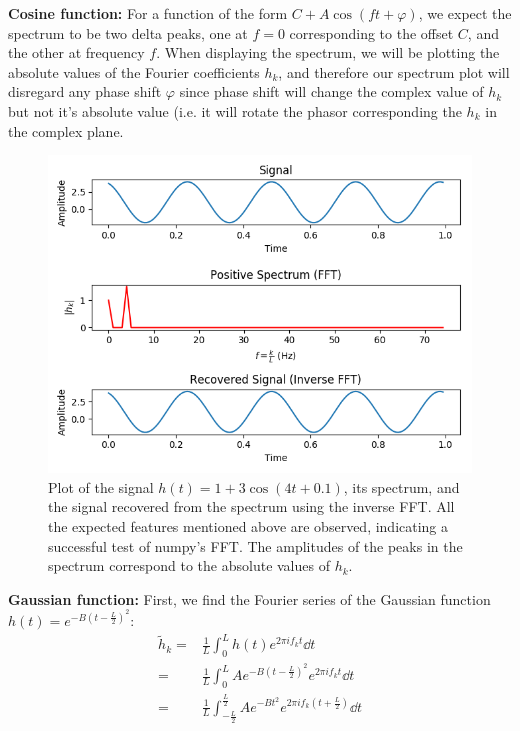 \documentclass[11pt]{article}
\begin{document}
\begin{enumerate}
	\textbf{Cosine function:} For a function of the form $C + A \cos (ft+\varphi)$, we expect the spectrum to be two delta peaks, one at $f=0$ corresponding to the offset $C$, and the other at frequency $f$. When displaying the spectrum, we will be plotting the absolute values of the Fourier coefficients $h_k$, and therefore our spectrum plot will disregard any phase shift $\varphi$ since phase shift will change the complex value of $h_k$ but not it's absolute value (i.e. it will rotate the phasor corresponding the $h_k$ in the complex plane.
	
\begin{figure}[htp]
\centering
\includegraphics[scale=1.00]{cosine_signal.png}
\caption{Plot of the signal $h(t)=1 + 3 \cos (4t+0.1)$, its spectrum, and the signal recovered from the spectrum using the inverse FFT. All the expected features mentioned above are observed, indicating a successful test of numpy's FFT. The amplitudes of the peaks in the spectrum correspond to the absolute values of $h_k$.}
\label{cos_signal}
\end{figure}
	\newpage
	\textbf{Gaussian function:} First, we find the Fourier series of the Gaussian function $h(t) = e^{-B(t-\frac{L}{2})^2}$:
	\begin{align}
	\tilde h_k =& \frac{1}{L} \int_0^L h(t) e^{2 \pi i f_{k} t} \dd{t} \\
	=& \frac{1}{L} \int_0^L A e^{-B(t-\frac{L}{2})^2} e^{2 \pi i f_{k} t} \dd{t} \\
	=& \frac{1}{L} \int_{-\frac{L}{2}}^{\frac{L}{2}} A e^{-Bt^2} e^{2 \pi i f_k (t + \frac{L}{2})} \dd{t} \\

\end{align}
\end{enumerate}
\end{document}
